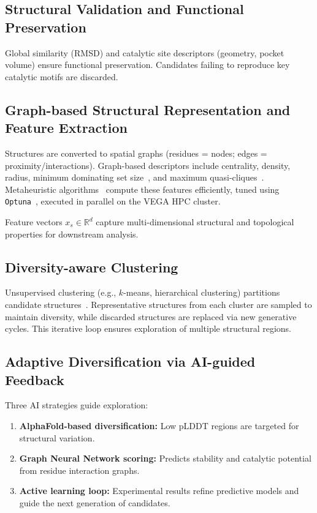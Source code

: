 \documentclass[runningheads]{llncs}
\begin{document}
	\subsection{Structural Validation and Functional Preservation}
	
	Global similarity (RMSD) and catalytic site descriptors (geometry, pocket volume) ensure functional preservation. Candidates failing to reproduce key catalytic motifs are discarded.
	
	\subsection{Graph-based Structural Representation and Feature Extraction}
	
	Structures are converted to spatial graphs (residues = nodes; edges = proximity/interactions). Graph-based descriptors include centrality, density, radius, minimum dominating set size~\cite{nacher2016minimum,milenkovic2011dominating}, and maximum quasi-cliques~\cite{bhattacharyya2009mining}. Metaheuristic algorithms~\cite{lin2016effective,pullan2011cooperating} compute these features efficiently, tuned using \texttt{Optuna}~\cite{agrawal2020optuna}, executed in parallel on the VEGA HPC cluster.
	
	Feature vectors $x_s \in \mathbb{R}^d$ capture multi-dimensional structural and topological properties for downstream analysis.
	
	\subsection{Diversity-aware Clustering}
	
	Unsupervised clustering (e.g., $k$-means, hierarchical clustering) partitions candidate structures~\cite{zou2020sequence}. Representative structures from each cluster are sampled to maintain diversity, while discarded structures are replaced via new generative cycles. This iterative loop ensures exploration of multiple structural regions.
	
	\subsection{Adaptive Diversification via AI-guided Feedback}
	
	Three AI strategies guide exploration:
	
	\begin{enumerate}
		\item \textbf{AlphaFold-based diversification:} Low pLDDT regions are targeted for structural variation.
		\item \textbf{Graph Neural Network scoring:} Predicts stability and catalytic potential from residue interaction graphs.
		\item \textbf{Active learning loop:} Experimental results refine predictive models and guide the next generation of candidates.
	\end{enumerate}
	
\end{document}
